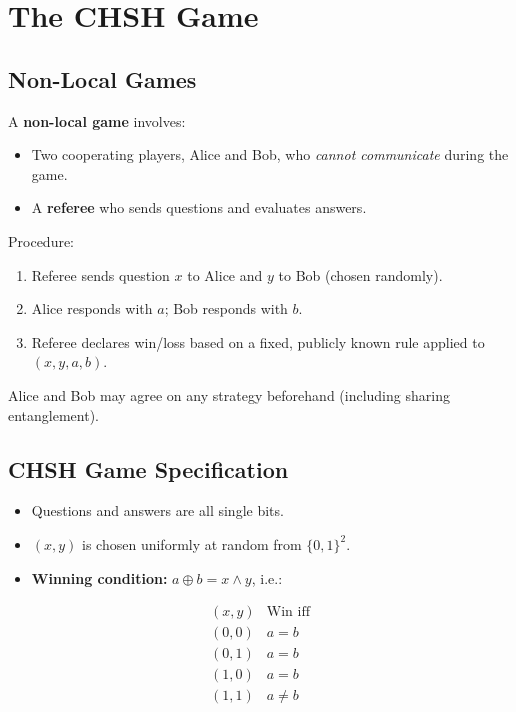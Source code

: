 \documentclass[11pt]{article}
\theoremstyle{definition}
\begin{document}
\section{The CHSH Game}

\subsection{Non-Local Games}

A \textbf{non-local game} involves:
\begin{itemize}
    \item Two cooperating players, Alice and Bob, who \emph{cannot communicate} during the game.
    \item A \textbf{referee} who sends questions and evaluates answers.
\end{itemize}

Procedure:
\begin{enumerate}
    \item Referee sends question $x$ to Alice and $y$ to Bob (chosen randomly).
    \item Alice responds with $a$; Bob responds with $b$.
    \item Referee declares win/loss based on a fixed, publicly known rule applied to $(x,y,a,b)$.
\end{enumerate}

Alice and Bob may agree on any strategy beforehand (including sharing entanglement).

\subsection{CHSH Game Specification}

\begin{itemize}
    \item Questions and answers are all single bits.
    \item $(x,y)$ is chosen uniformly at random from $\{0,1\}^2$.
    \item \textbf{Winning condition:} $a\oplus b = x\wedge y$, i.e.:
\end{itemize}
\[
\begin{array}{c|c}
(x,y) & \text{Win iff} \\\hline
(0,0) & a = b \\
(0,1) & a = b \\
(1,0) & a = b \\
(1,1) & a \neq b
\end{array}
\]
\end{document}
